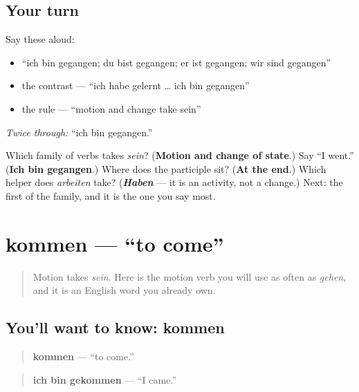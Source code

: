 \subsection*{Your turn}
Say these aloud:

\begin{itemize}
\raggedright
  \item \textquotedblleft{}ich bin gegangen; du bist gegangen; er ist gegangen; wir sind gegangen\textquotedblright{}
  \item the contrast — \textquotedblleft{}ich habe gelernt … ich bin gegangen\textquotedblright{}
  \item the rule — \textquotedblleft{}motion and change take sein\textquotedblright{}
\end{itemize}

\emph{Twice through:} \textquotedblleft{}ich bin gegangen.\textquotedblright{}

\begin{tcolorbox}[breakable,colback=teal!4,colframe=teal!35!black,title={Before you move on}]
Which family of verbs takes \emph{sein}? (\textbf{Motion and change of state}.) Say \textquotedblleft{}I went.\textquotedblright{} (\textbf{Ich bin gegangen}.) Where does the participle sit? (\textbf{At the end}.) Which helper does \emph{arbeiten} take? (\emph{\textbf{Haben}} — it is an activity, not a change.) Next: the first of the family, and it is the one you say most.
\end{tcolorbox}
\section[kommen]{kommen — \textquotedblleft{}to come\textquotedblright{}}

\label{lesson:GE-C16-kommen}



\begin{quote}
Motion takes \emph{sein}. Here is the motion verb you will use as often as \emph{gehen}, and it is an English word you already own.
\end{quote}

\subsection*{You'll want to know: kommen}
\begin{quote}
\textbf{kommen} — \textquotedblleft{}to come.\textquotedblright{}
\end{quote}

\begin{quote}
\textbf{ich bin gekommen} — \textquotedblleft{}I came.\textquotedblright{}
\end{quote}

